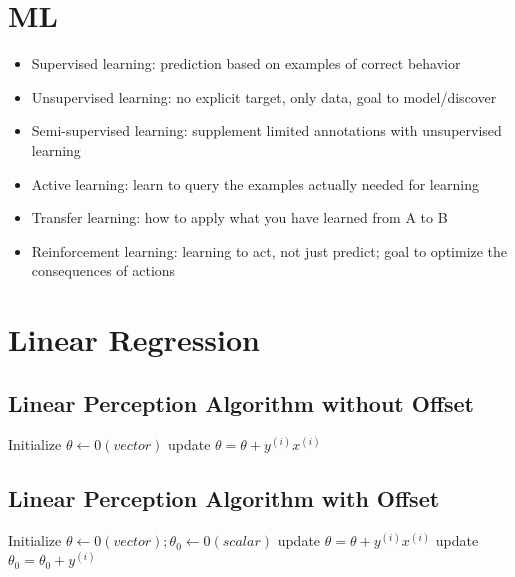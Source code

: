 
\section{ML}
\begin{itemize}
    \item Supervised learning: prediction based on examples of correct behavior
    \item Unsupervised learning: no explicit target, only data, goal to model/discover
    \item Semi-supervised learning: supplement limited annotations with unsupervised learning
    \item Active learning: learn to query the examples actually needed for learning
    \item Transfer learning: how to apply what you have learned from A to B
    \item Reinforcement learning: learning to act, not just predict; goal to optimize the consequences of actions
\end{itemize}


\section{Linear Regression}

\subsection{Linear Perception Algorithm without Offset}
\begin{algorithmic}
\State Initialize $\theta \gets 0(vector)$
            \State update $\theta =\theta + y^{(i)}x^{(i)}$
        \EndIf
    \EndFor
\EndFor
\end{algorithmic}


\subsection{Linear Perception Algorithm with Offset}
\begin{algorithmic}
\State Initialize $\theta \gets 0(vector); \theta_{0} \gets 0(scalar)$
            \State update $\theta =\theta + y^{(i)}x^{(i)}$
            \State update $\theta_{0} =\theta_{0} + y^{(i)}$
        \EndIf
    \EndFor
\EndFor
\end{algorithmic}

